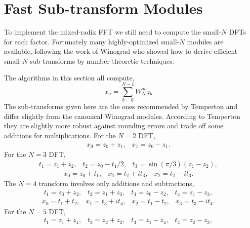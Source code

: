 \documentclass[fleqn,12pt]{article}
\begin{document}
\section{Fast Sub-transform Modules}
%
To implement the mixed-radix FFT we still need to compute the
small-$N$ DFTs for each factor. Fortunately many highly-optimized
small-$N$ modules are available, following the work of Winograd who
showed how to derive efficient small-$N$ sub-transforms by number
theoretic techniques.

The algorithms in this section all compute,
%
\begin{equation}
x_a = \sum_{b=0}^{N-1} W_N^{ab} z_b
\end{equation}
%
The sub-transforms given here are the ones recommended by Temperton
and differ slightly from the canonical Winograd modules. According to
Temperton~\cite{temperton83} they are slightly more robust against
rounding errors and trade off some additions for multiplications.
%
For the $N=2$ DFT,
%
\begin{equation}
\begin{array}{ll}
x_0 = z_0 + z_1, &
x_1 = z_0 - z_1. 
\end{array}
\end{equation}
%
For the $N=3$ DFT,
%
\begin{equation}
\begin{array}{lll}
t_1 = z_1 + z_2, &
t_2 = z_0 - t_1/2, &
t_3 = \sin(\pi/3) (z_1 - z_2), 
\end{array}
\end{equation}
\begin{equation}
\begin{array}{lll}
x_0 = z_0 + t_1, &
x_1 = t_2 + i t_3, &
x_2 = t_2 - i t_3. 
\end{array}
\end{equation}
%
The $N=4$ transform involves only additions and subtractions,
%
\begin{equation}
\begin{array}{llll}
t_1 = z_0 + z_2, &
t_2 = z_1 + z_3, &
t_3 = z_0 - z_2, &
t_4 = z_1 - z_3,
\end{array}
\end{equation}
\begin{equation}
\begin{array}{llll}
x_0 = t_1 + t_2, &
x_1 = t_3 + i t_4, &
x_2 = t_1 - t_2, &
x_3 = t_3 - i t_4.
\end{array}
\end{equation}
%
For the $N=5$ DFT,
%
\begin{equation}
\begin{array}{llll}
t_1 = z_1 + z_4, &
t_2 = z_2 + z_3, &
t_3 = z_1 - z_4, &
t_4 = z_2 - z_3,
\end{array}
\end{equation}
\end{document}
